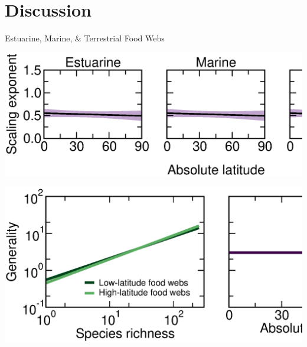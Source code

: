 \documentclass{beamer}
\begin{document}
\section*{Discussion}

  \begin{frame}{Estuarine, Marine, \& Terrestrial Food Webs}
    \begin{center}
      \includegraphics*[width=.9\textwidth]{Figures/results/no_effect.eps}

    \vspace{.5cm}

    \includegraphics*[width=.75\textwidth]{Figures/results/no_effect_interpretations.eps}

    \end{center}
  \end{frame}
\end{document}
